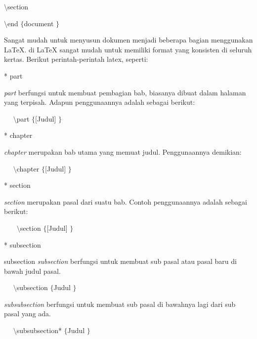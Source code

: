  \par
\vspace{10pt}
{\fontsize{10pt}{10pt}\selectfont  $  \setminus  $section}
 \par
\vspace{10pt}
{\fontsize{10pt}{10pt}\selectfont  $  \setminus  $end $  \{  $document $  \}  $}
 \par
\vspace{10pt}
\vspace{12pt}
Sangat mudah untuk menyusun dokumen menjadi beberapa bagian menggunakan LaTeX. di LaTeX sangat mudah untuk memiliki format yang konsisten di seluruh kertas. Berikut perintah-perintah latex, seperti:
 \par
* part \par
\textit{part} berfungsi untuk membuat pembagian bab, biasanya dibuat dalam halaman yang terpisah. Adapun penggunaannya adalah sebagai berikut:
 \par
{\fontsize{10pt}{10pt}\selectfont ~~  $  \setminus  $part $  \{  $[Judul] $  \}  $}
 \par
  \vspace{10pt}
* chapter \par
\textit{chapter} merupakan bab utama yang memuat judul. Penggunaannya demikian:
\par
{\fontsize{10pt}{10pt}\selectfont ~~  $  \setminus  $chapter $  \{  $[Judul] $  \}  $}
\par
\vspace{10pt}
* section \par
\textit{section} merupakan pasal dari suatu bab. Contoh penggunaannya adalah sebagai berikut:\
 \par
{\fontsize{10pt}{10pt}\selectfont ~~~  $  \setminus  $section $  \{  $[Judul] $  \}  $}
 \par
 \vspace{10pt}
* subsection \par
subsection \textit{subsection} berfungsi untuk membuat sub pasal atau pasal baru di bawah judul pasal.
 \par
{\fontsize{10pt}{10pt}\selectfont ~~  $  \setminus  $subsection $  \{  $Judul $  \}  $}
 \par
 \vspace{10pt}
\textit{subsubsection} berfungsi untuk membuat sub pasal di bawahnya lagi dari sub pasal yang ada.
 \par
{\fontsize{10pt}{10pt}\selectfont ~~  $  \setminus  $subsubsection* $  \{  $Judul $  \}  $}
 \par
 \vspace{10pt}
